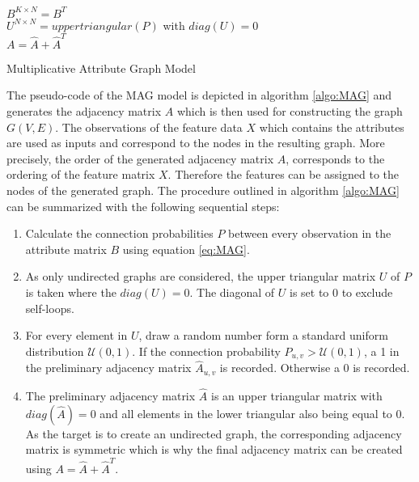 	\begin{algorithm}[h]
		\scriptsize
		\SetAlgoLined
		\nl $B^{K \times N} = B^{T}$ \\
		\nl {}
		\nl $U^{N \times N} = uppertriangular(P)$ with $diag(U)=0$\\
		\nl {}
		\nl $A = \hat A + \hat A^{T}$
		\caption{Multiplicative Attribute Graph Model}
		\label{algo:MAG}
	\end{algorithm}

	\noindent The pseudo-code of the MAG model is depicted in algorithm 
	\ref{algo:MAG} and generates the adjacency matrix $A$ which is then used 
	for constructing the graph $G(V,E)$. The observations of the feature data 
	$X$ which contains the attributes are used as inputs and correspond to the 
	nodes in the resulting graph. More precisely, the order of the generated 
	adjacency matrix $A$, corresponds to the ordering of the feature matrix $X$. 
	Therefore the features can be assigned to the nodes of the generated graph. 
	The procedure outlined in algorithm \ref{algo:MAG} can be summarized with 
	the following sequential steps:

	\begin{enumerate}
		\item Calculate the connection probabilities $P$ between every 
			observation in the attribute matrix $B$ using equation \ref{eq:MAG}. 
		\item As only undirected graphs are considered, the upper triangular
			matrix $U$ of $P$ is taken where the $diag(U) = 0$. The diagonal of
			$U$ is set to 0 to exclude self-loops.
		\item For every element in $U$, draw a random number form a standard
			uniform distribution $\mathcal{U}(0,1)$. If the connection
			probability $P_{u,v}>\mathcal{U}(0,1)$, a 1 in the
			preliminary adjacency matrix $\hat A_{u,v}$ is recorded.
			Otherwise a 0 is recorded.
		\item The preliminary adjacency matrix $\hat A$ is an upper triangular
			matrix with $diag(\hat A) = 0$ and all elements in the lower
			triangular also being equal to 0. As the target is to create an
			undirected graph, the corresponding adjacency matrix is symmetric
			which is why the final adjacency matrix can be created using 
			$A = \hat A + \hat A^{T}$. 
	\end{enumerate}
 
